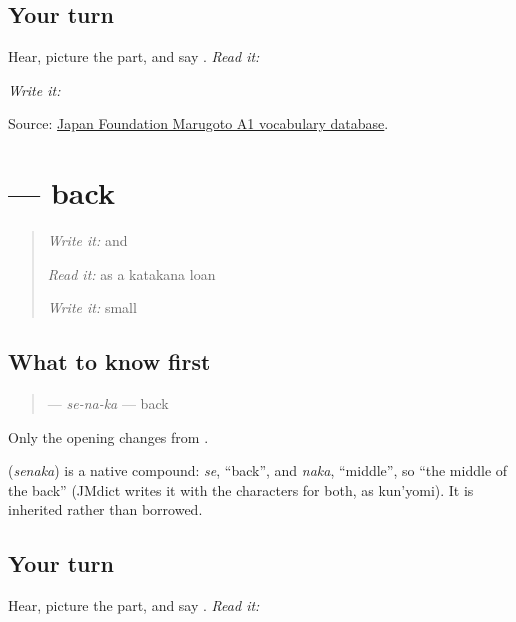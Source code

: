 \subsection*{Your turn}
Hear, picture the part, and say \textbf{}. \emph{Read it:} \textbf{}

\emph{Write it:} \textbf{}

\begin{tcolorbox}[breakable,colback=teal!4,colframe=teal!35!black,title={Before you move on}]
Source: \href{https://words.marugotoweb.jp/}{Japan Foundation Marugoto A1 vocabulary database}.
\end{tcolorbox}
\section[\texorpdfstring{\ja{せなか} (senaka)}{せなか (senaka)}]{ — back}

\label{lesson:JA-C12-senaka}



\begin{quote}
\emph{Write it:} \textbf{} and \textbf{}

\emph{Read it:} \textbf{} as a katakana loan

\emph{Write it:} small \textbf{}
\end{quote}

\subsection*{What to know first}
\begin{quote}
\textbf{} — \emph{se-na-ka} — back
\end{quote}

Only the opening changes from \textbf{}.

\begin{cousinweb}
\textbf{} (\emph{senaka}) is a native compound: \emph{se}, \textquotedblleft{}back\textquotedblright{}, and \emph{naka}, \textquotedblleft{}middle\textquotedblright{}, so \textquotedblleft{}the middle of the back\textquotedblright{} (JMdict writes it with the characters for both, as kun'yomi). It is inherited rather than borrowed.
\end{cousinweb}

\subsection*{Your turn}
Hear, picture the part, and say \textbf{}. \emph{Read it:} \textbf{}

